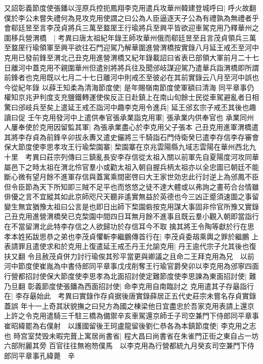 又詔彰義節度使張鐇以涇原兵控扼鳳翔李克用遣兵攻華州韓建登城呼曰|{
	呼火故翻}
僕於李公未嘗失禮何為見攻克用使謂之曰公為人臣逼逐天子公為有禮孰為無禮者乎會郗廷昱至言李茂貞將兵三萬至盩厔王行瑜將兵至興平皆欲迎車駕克用乃釋華州之圍移兵營渭橋　|{
	考異曰唐太祖紀年錄王師攻華州俄而郗廷昱至且言茂貞領兵三萬至盩厔行瑜領軍至興平欲往石門迎駕乃解華圍進營渭橋按實錄八月延王戒丕至河中克用已發前鋒至渭北己丑克用進營渭橋又紀年錄載詔曰省表已部領大軍前月二十七日離河中蓋克用不親圍華州但遣别將將兵往及聞邠岐謀迎駕乃遣華兵詣渭橋即所謂前鋒者也克用既以七月二十七日離河中則戒丕至彼必在其前實錄云八月至河中誤也今從紀年錄}
以薛王知柔為清海節度使|{
	是年賜嶺南節度使軍額曰清海}
同平章事仍權知京兆尹判度支充鹽鐵轉運使俟反正日赴鎮上在南山旬餘士民從車駕避亂者日相驚曰邠岐兵至矣上遣延王戒丕詣河中趣李克用令進兵|{
	延王邠玄宗子戒丕其後也趣讀曰促}
壬午克用發河中上遣供奉官張承業詣克用軍|{
	張承業内供奉官也}
承業同州人屢奉使於克用因留監其軍|{
	為張承業盡心於李克用父子張本}
己丑克用進軍渭橋遣其將李存貞為前鋒辛卯拔永夀又遣史儼將三千騎詣石門侍衛癸巳遣李存信李存審會保大節度使李思孝攻王行瑜棃園寨|{
	棃園寨在京兆雲陽縣九域志雲陽在華州西北九十里　考異曰莊宗列傳曰三鎮亂長安李存信從太祖入關以前軍先自夏陽度河攻同華屬邑下之時太祖在渭北伶官羣小或勸太祖入朝自握兵柄太祖亦以全忠圖已朝廷不能斷心微有望月餘不進軍存信與蓋寓乘間密啓曰大王家世効忠此行討逆上為邠鳳不臣但令臣節為天下所知即三賊不足平也而悠悠之徒不達大體或以弗詢之畫苟合台情雖俳優之言不宜縱其如此京師咫尺天聽非遙實無益於英德也今三凶正蹙須速圖之事留變生無宜猶豫太祖曰公言是也即日出師下棃園砦按克用謀大事固非伶官所豫又實錄己丑克用進營渭橋癸已克棃園中間四日耳無月餘不進事且既云羣小觀入朝即當詣行在不當留渭北此特李存信之人欲歸功於存信耳今不取}
擒其將王令陶等獻於行在思孝本姓拓跋思恭之弟也李茂貞懼斬李繼鵬傳首行在|{
	李茂貞委刼乘輿之罪於繼鵬}
上表請罪且遣使求和於克用上復遣延王戒丕丹王允諭克用|{
	丹王逾代宗子允其後也復扶又翻}
令且赦茂貞併力討行瑜俟其殄平當更與卿議之且命二王拜克用為兄　以前河中節度使崔胤為中書侍郎同平章事戊戌削奪王行瑜官爵癸卯以李克用為邠寧四面行營都招討使保大節度使李思孝為北面招討使定難節度使李思諫為東面招討使|{
	難乃旦翻}
彰義節度使張鐇為西面招討使|{
	命李克用自南臨討之}
克用遣其子存朂詣行在|{
	李存朂始此　考異曰實錄作存貞据後唐實錄薛居正五代史莊宗未嘗名存貞實錄蓋誤}
年十一上奇其狀貌撫之曰兒方為國之棟梁他日宜盡忠於吾家克用表請上還京上許之令克用遣騎三千駐三橋為備禦辛亥車駕還京師壬子司空兼門下侍郎同平章事崔昭緯罷為右僕射　以護國留後王珂盧龍留後劉仁恭各為本鎮節度使|{
	李克用之志也}
時宫室焚毁未暇完葺上寓居尚書省|{
	程大昌曰尚書省在朱雀門正街之東自占一坊六部附麗其旁}
百官往往無袍笏僕馬　以李克用為行營都統九月癸亥司空兼門下侍郎同平章事孔緯薨　辛

